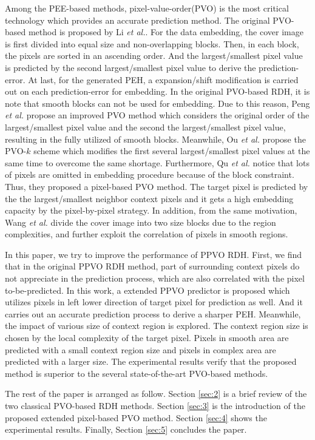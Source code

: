 \documentclass[review,3p,10pt,sort&compress]{elsarticle}
\begin{document}
Among the PEE-based methods, pixel-value-order(PVO) is the most critical technology which provides an accurate prediction method. The original PVO-based method is proposed by Li \emph{et al.}. For the data embedding, the cover image is first divided into equal size and non-overlapping blocks. Then, in each block, the pixels are sorted in an ascending order. And the largest/smallest pixel value is predicted by the second largest/smallest pixel value to derive the prediction-error. At last, for the generated PEH, a expansion/shift modification is carried out on each prediction-error for embedding. In the original PVO-based RDH, it is note that smooth blocks can not be used for embedding. Due to this reason, Peng \emph{et al.} propose an improved PVO method which considers the original order of the largest/smallest pixel value and the second the largest/smallest pixel value, resulting in the fully utilized of smooth blocks. Meanwhile, Ou \emph{et al.} propose the PVO-$k$ scheme which modifies the first several largest/smallest pixel values at the same time to overcome the same shortage. Furthermore, Qu \emph{et al.} notice that lots of pixels are omitted in embedding procedure because of the block constraint. Thus, they proposed a pixel-based PVO method. The target pixel is predicted by the the largest/smallest neighbor context pixels and it gets a high embedding capacity by the pixel-by-pixel strategy.
In addition, from the same motivation, Wang \emph{et al.} divide the cover image into two size blocks due to the region complexities, and further exploit the correlation of pixels in smooth regions.

In this paper, we try to improve the performance of PPVO RDH. First, we find that in the original PPVO RDH method, part of surrounding context pixels do not appreciate in the prediction process, which are also correlated with the pixel to-be-predicted. In this work, a extended PPVO predictor is proposed which utilizes pixels in left lower direction of target pixel for prediction as well. And it carries out an accurate prediction process to derive a sharper PEH. Meanwhile, the impact of various size of context region is explored. The context region size is chosen by the local complexity of the target pixel. Pixels in smooth area are predicted with a small context region size and pixels in complex area are predicted with a larger size. The experimental results verify that the proposed method is superior to the several state-of-the-art PVO-based methods.

The rest of the paper is arranged as follow. Section \ref{sec:2} is a brief review of the two classical PVO-based RDH methods. Section \ref{sec:3} is the introduction of the proposed extended pixel-based PVO method. Section \ref{sec:4} shows the experimental results. Finally, Section \ref{sec:5} concludes the paper.
\end{document}
